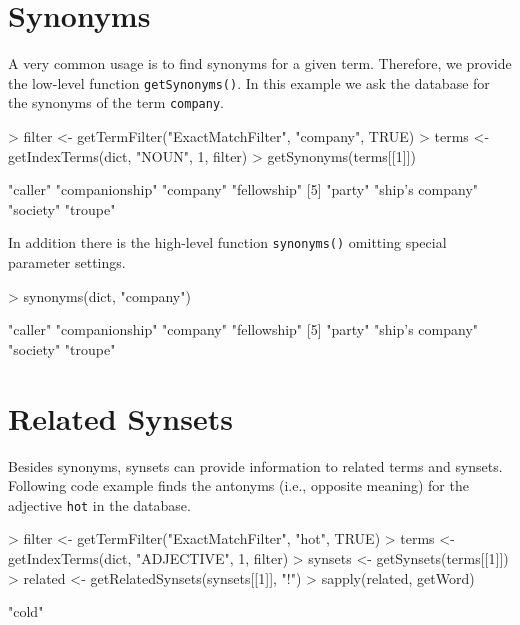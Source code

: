 \documentclass[a4paper]{article}
\newcommand{\code}[1]{\mbox{\texttt{#1}}}
\begin{document}
\section*{Synonyms}
A very common usage is to find synonyms for a given term. Therefore,
we provide the low-level function \code{getSynonyms()}. In this example
we ask the database for the synonyms of the term \code{company}.
\begin{Schunk}
\begin{Sinput}
> filter <- getTermFilter("ExactMatchFilter", "company", TRUE)
> terms <- getIndexTerms(dict, "NOUN", 1, filter)
> getSynonyms(terms[[1]])
\end{Sinput}
\begin{Soutput}
[1] "caller"         "companionship"  "company"        "fellowship"    
[5] "party"          "ship's company" "society"        "troupe"        
\end{Soutput}
\end{Schunk}
In addition there is the high-level function \code{synonyms()}
omitting special parameter settings.
\begin{Schunk}
\begin{Sinput}
> synonyms(dict, "company")
\end{Sinput}
\begin{Soutput}
[1] "caller"         "companionship"  "company"        "fellowship"    
[5] "party"          "ship's company" "society"        "troupe"        
\end{Soutput}
\end{Schunk}

\section*{Related Synsets}
Besides synonyms, synsets can provide information to related terms and
synsets. Following code example finds the antonyms (i.e., opposite
meaning) for the adjective \code{hot} in the database.
\begin{Schunk}
\begin{Sinput}
> filter <- getTermFilter("ExactMatchFilter", "hot", TRUE)
> terms <- getIndexTerms(dict, "ADJECTIVE", 1, filter)
> synsets <- getSynsets(terms[[1]])
> related <- getRelatedSynsets(synsets[[1]], "!")
> sapply(related, getWord)
\end{Sinput}
\begin{Soutput}
[1] "cold"
\end{Soutput}
\end{Schunk}
\end{document}
